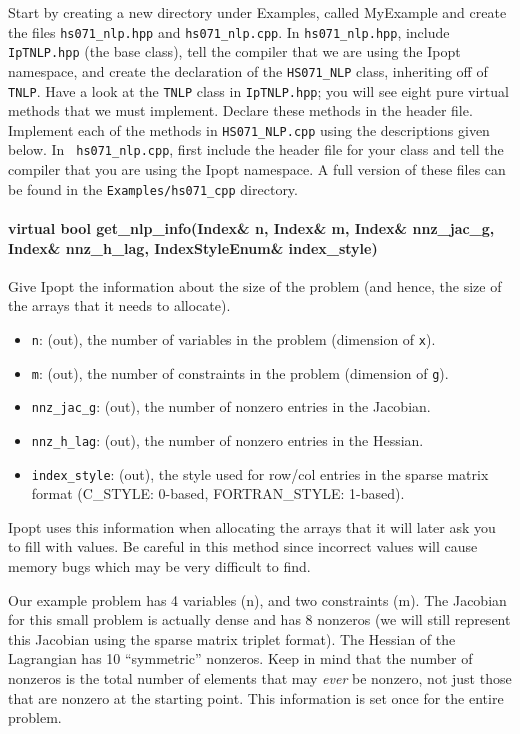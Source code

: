 \documentclass[letter,10pt]{article}
\begin{document}
{Start by creating a new directory under Examples, called MyExample and
create the files {\tt hs071\_nlp.hpp} and {\tt hs071\_nlp.cpp}. In
{\tt hs071\_nlp.hpp}, include {\tt IpTNLP.hpp} (the base class), tell
the compiler that we are using the Ipopt namespace, and create the
declaration of the {\tt HS071\_NLP} class, inheriting off of {\tt
  TNLP}. Have a look at the {\tt TNLP} class in {\tt IpTNLP.hpp}; you
will see eight pure virtual methods that we must implement. Declare
these methods in the header file.  Implement each of the methods in
{\tt HS071\_NLP.cpp} using the descriptions given below. In {\tt
  hs071\_nlp.cpp}, first include the header file for your class and
tell the compiler that you are using the Ipopt namespace. A full
version of these files can be found in the {\tt Examples/hs071\_cpp}
directory.

\paragraph{virtual bool get\_nlp\_info(Index\& n, Index\& m, Index\& nnz\_jac\_g, \\
Index\& nnz\_h\_lag, IndexStyleEnum\& index\_style)} 
$\;$ \\
Give Ipopt the information about the size of the problem (and hence,
the size of the arrays that it needs to allocate). 
\begin{itemize}
\item {\tt n}: (out), the number of variables in the problem (dimension of {\tt x}).
\item {\tt m}: (out), the number of constraints in the problem (dimension of {\tt g}).
\item {\tt nnz\_jac\_g}: (out), the number of nonzero entries in the Jacobian.
\item {\tt nnz\_h\_lag}: (out), the number of nonzero entries in the Hessian.
\item {\tt index\_style}: (out), the style used for row/col entries in the sparse matrix
format (C\_STYLE: 0-based, FORTRAN\_STYLE: 1-based).
\end{itemize}
Ipopt uses this information when allocating the arrays that
it will later ask you to fill with values. Be careful in this method
since incorrect values will cause memory bugs which may be very
difficult to find.

Our example problem has 4 variables (n), and two constraints (m). The
Jacobian for this small problem is actually dense and has 8 nonzeros
(we will still represent this Jacobian using the sparse matrix triplet
format). The Hessian of the Lagrangian has 10 ``symmetric'' nonzeros.
Keep in mind that the number of nonzeros is the total number of
elements that may \emph{ever} be nonzero, not just those that are
nonzero at the starting point. This information is set once for the
entire problem.

}
\end{document}
